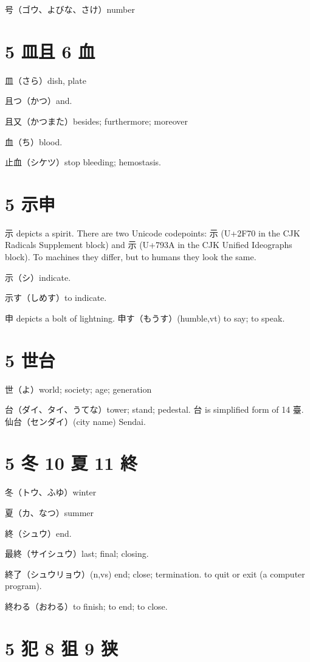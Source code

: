 号（ゴウ、よびな、さけ）number

\section{5 皿且 6 血}

皿（さら）dish, plate

且つ（かつ）and.

且又（かつまた）besides; furthermore; moreover

血（ち）blood.

止血（シケツ）stop bleeding; hemostasis.

\section{5 示申}

示 depicts a spirit.
There are two Unicode codepoints:
⽰ (U+2F70 in the CJK Radicals Supplement block)
and 示 (U+793A in the CJK Unified Ideographs block).
To machines they differ,
but to humans they look the same.

示（シ）indicate.

示す（しめす）to indicate.

申 depicts a bolt of lightning.
申す（もうす）(humble,vt) to say; to speak.

\section{5 世台}

世（よ）world; society; age; generation

台（ダイ、タイ、うてな）tower; stand; pedestal.
台 is simplified form of 14 臺.
仙台（センダイ）(city name) Sendai.

\section{5 冬 10 夏 11 終}

冬（トウ、ふゆ）winter

夏（カ、なつ）summer

終（シュウ）end.

最終（サイシュウ）last; final; closing.

終了（シュウリョウ）(n,vs)
end; close; termination.
to quit or exit (a computer program).

終わる（おわる）to finish; to end; to close.

\section{5 犯 8 狙 9 狭}


